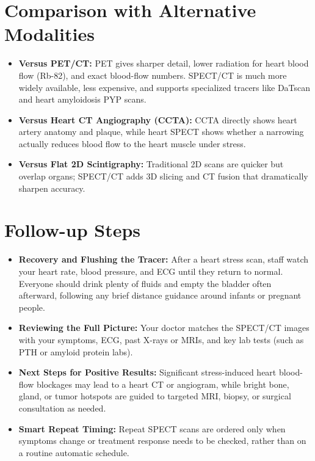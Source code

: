 \section{Comparison with Alternative Modalities}

\begin{itemize}
    \item \textbf{Versus PET/CT:} PET gives sharper detail, lower radiation for heart blood flow (Rb-82), and exact blood-flow numbers. SPECT/CT is much more widely available, less expensive, and supports specialized tracers like DaTscan and heart amyloidosis PYP scans.
    \item \textbf{Versus Heart CT Angiography (CCTA):} CCTA directly shows heart artery anatomy and plaque, while heart SPECT shows whether a narrowing actually reduces blood flow to the heart muscle under stress.
    \item \textbf{Versus Flat 2D Scintigraphy:} Traditional 2D scans are quicker but overlap organs; SPECT/CT adds 3D slicing and CT fusion that dramatically sharpen accuracy.
\end{itemize}

\section{Follow-up Steps}

\begin{itemize}
    \item \textbf{Recovery and Flushing the Tracer:} After a heart stress scan, staff watch your heart rate, blood pressure, and ECG until they return to normal. Everyone should drink plenty of fluids and empty the bladder often afterward, following any brief distance guidance around infants or pregnant people.
    \item \textbf{Reviewing the Full Picture:} Your doctor matches the SPECT/CT images with your symptoms, ECG, past X-rays or MRIs, and key lab tests (such as PTH or amyloid protein labs).
    \item \textbf{Next Steps for Positive Results:} Significant stress-induced heart blood-flow blockages may lead to a heart CT or angiogram, while bright bone, gland, or tumor hotspots are guided to targeted MRI, biopsy, or surgical consultation as needed.
    \item \textbf{Smart Repeat Timing:} Repeat SPECT scans are ordered only when symptoms change or treatment response needs to be checked, rather than on a routine automatic schedule.
\end{itemize}

